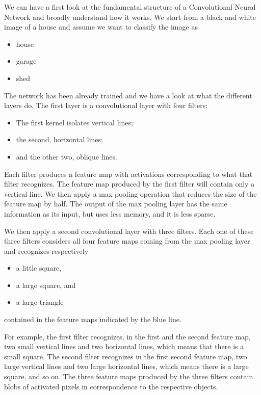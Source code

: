 We can have a first look at the fundamental structure of a Convolutional Neural Network and broadly understand how it works.
We start from a black and white image of a house and assume we want to classify the image as 
\begin{itemize}
    \item house
    \item garage
    \item shed
\end{itemize}

The network has been already trained and we have a look at what the different layers do.
The first layer is a convolutional layer with four filters: 
\begin{itemize}
    \item The first kernel isolates vertical lines;
    \item the second, horizontal lines;
    \item and the other two, oblique lines.
\end{itemize}
Each filter produces a feature map with activations corresponding to what that filter recognizes. The feature map produced by the first filter will contain only a vertical line. We then apply a max pooling operation that reduces the size of the feature map by half. The output of the max pooling layer has the same information as its input, but uses less memory, and it is less sparse. \newline

We then apply a second convolutional layer with three filters. Each one of these three filters considers all four feature maps coming from the max pooling layer and recognizes respectively 
\begin{itemize}
    \item a little square,
    \item a large square, and
    \item a large triangle
\end{itemize}
contained in the feature maps indicated by the blue line.

For example, the first filter recognizes, in the first and the second feature map, two small vertical lines and two horizontal lines, which means that there is a small square. The second filter recognizes in the first second feature map, two large vertical lines and two large horizontal lines, which means there is a large square, and so on. The three feature maps produced by the three filters contain blobs of activated pixels in correspondence to the respective objects. \newline


